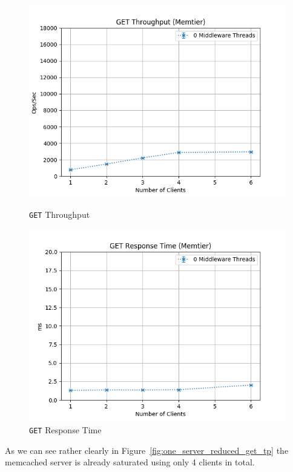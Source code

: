 \documentclass[11pt,a4paper]{article}
\begin{document}
\begin{figure}[H]
    \centering
    \captionsetup{width=0.4\textwidth}
    \begin{minipage}{0.5\textwidth}
        \centering
        \includegraphics[width=\textwidth]{../illustrations/plots/1_1_1_one_server_reduced/0-1/memtier_get_tp_s.png}
        \caption{\texttt{GET} Throughput}
        \label{fig:one_server_reduced_get_tp}
    \end{minipage}\hfill
    \begin{minipage}{0.5\textwidth}
        \centering
        \includegraphics[width=\textwidth]{../illustrations/plots/1_1_1_one_server_reduced/0-1/memtier_get_rt_ms.png}
        \caption{\texttt{GET} Response Time}
        \label{fig:one_server_reduced_get_rt}
    \end{minipage}
\end{figure}
%
As we can see rather clearly in Figure~\ref{fig:one_server_reduced_get_tp} the memcached server is already saturated using only 4 clients in total.
%
\end{document}
